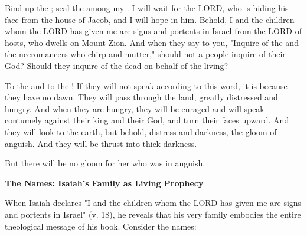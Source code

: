 \documentclass[11pt]{article}
\begin{document}
\begin{biblicaloutline}[Isaiah 8:16-9:1a]
    \begin{versesection}{2em}
         Bind up the ; seal the  among my . I will wait for the LORD, who is hiding his face from the house of Jacob, and I will hope in him.  Behold, I and the children whom the LORD has given me are signs and portents in Israel from the LORD of hosts, who dwells on Mount Zion.  And when they say to you, "Inquire of the  and the necromancers who chirp and mutter," should not a people inquire of their God? Should they inquire of the dead on behalf of the living?
    \end{versesection}

    \begin{versesection}{2em}
         To the  and to the ! If they will not speak according to this word, it is because they have no dawn.  They will pass through the land, greatly distressed and hungry. And when they are hungry, they will be enraged and will speak contumely against their king and their God, and turn their faces upward.  And they will look to the earth, but behold, distress and darkness, the gloom of anguish. And they will be thrust into thick darkness.

         But there will be no gloom for her who was in anguish.
    \end{versesection}

\end{biblicaloutline}

\vspace{3em}
{\large\bfseries The Names: Isaiah's Family as Living Prophecy}
\vspace{1em}

When Isaiah declares "I and the children whom the LORD has given me are signs and portents in Israel" (v. 18), he reveals that his very family embodies the entire theological message of his book. Consider the names:

\vspace{1em}
\end{document}
